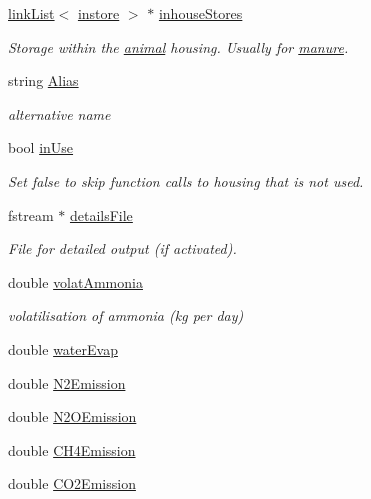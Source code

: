 \begin{DoxyCompactItemize}
\hyperlink{classlink_list}{linkList}$<$ \hyperlink{classinstore}{instore} $>$ $\ast$ \hyperlink{classstable_ad827c2a4881390861ed8dc4ebc4358b9}{inhouseStores}
\begin{DoxyCompactList}\small\item\em Storage within the \hyperlink{classanimal}{animal} housing. Usually for \hyperlink{classmanure}{manure}. \item\end{DoxyCompactList}\item 
string \hyperlink{classstable_a271c0bd63a923bc1073e0055a5d023bf}{Alias}
\begin{DoxyCompactList}\small\item\em alternative name \item\end{DoxyCompactList}\item 
bool \hyperlink{classstable_a98595703d682fc7a073100f8eb04f8fc}{inUse}
\begin{DoxyCompactList}\small\item\em Set false to skip function calls to housing that is not used. \item\end{DoxyCompactList}\item 
fstream $\ast$ \hyperlink{classstable_aa1825c229093fbb6ace9325613c4837b}{detailsFile}
\begin{DoxyCompactList}\small\item\em File for detailed output (if activated). \item\end{DoxyCompactList}\item 
double \hyperlink{classstable_a1f0ac889ae9a48dc82e55e3a98ae233b}{volatAmmonia}
\begin{DoxyCompactList}\small\item\em volatilisation of ammonia (kg per day) \item\end{DoxyCompactList}\item 
double \hyperlink{classstable_a07f66a7a6e1bc573583fe29c2b3e1855}{waterEvap}
\item 
double \hyperlink{classstable_a92a798364c13ada51dea903e382a4324}{N2Emission}
\item 
double \hyperlink{classstable_ac2affdc6d7ce852d12562a3725cd56bb}{N2OEmission}
\item 
double \hyperlink{classstable_aadb2a305188cecdae4ebdb8a519ce6ef}{CH4Emission}
\item 
double \hyperlink{classstable_aa54ec15545c243cd78c81c79a517dbab}{CO2Emission}
\end{DoxyCompactItemize}
